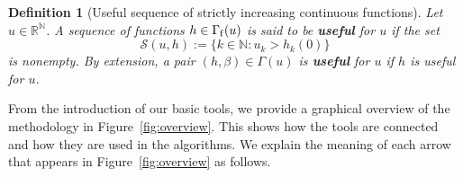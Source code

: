 \documentclass{article}
\def\funset{\Gamma}
\def\secfunh{\funset_{\rm f}}
\def\rr{\mathbb R}
\def\nn{\mathbb N}
\def\res{\mathcal{S}}
\newtheorem{defi}{Definition}
\def\blue#1{#1}
\begin{document}
{	\begin{defi}[Useful sequence of strictly increasing continuous functions]
		\label{useful}
		Let $u\in\rr^\nn$. A sequence of functions $h\in \secfunh(u)$ is said to be {\bf useful} for $u$ if the set
		\begin{equation}
			\label{residual}
			\res(u,h):=\{k\in\nn : u_k>h_k(0)\}
		\end{equation}
		is nonempty. 		
		By extension, a pair $(h,\beta)\in\funset(u)$ is {\bf useful} for $u$ if $h$ is useful for $u$.
	\end{defi} 
}
\blue{
From the introduction of our basic tools, we provide a graphical overview of the methodology in Figure~\ref{fig:overview}. This shows how the tools are connected and how they are used in the algorithms. We explain the meaning of each arrow that appears in Figure~\ref{fig:overview} as follows.
}
\end{document}
